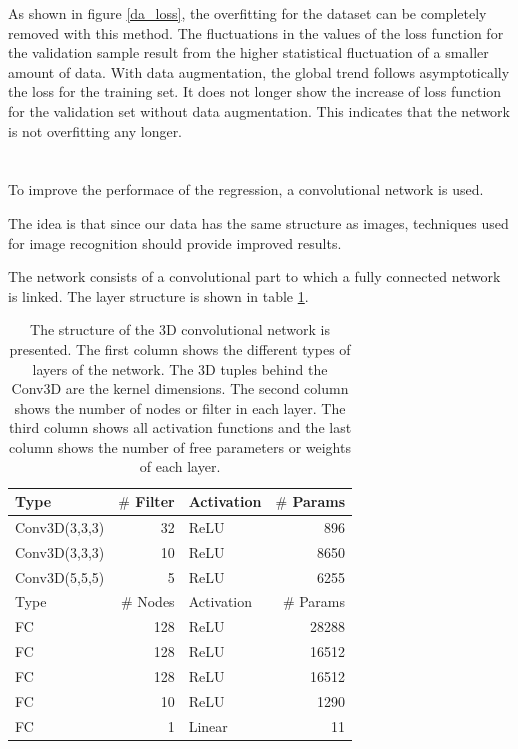 \documentclass[12pt, a4paper]{thesis}
\begin{document}
As shown in figure \ref{da_loss}, the overfitting for the dataset can
be completely removed with this method.  The fluctuations in the
values of the loss function for the validation sample result from the
higher statistical fluctuation of a smaller amount of data. With data
augmentation, the global trend follows asymptotically the loss for the
training set. It does not longer show the increase of loss function
for the validation set without data augmentation. This indicates that
the network is not overfitting any longer.

\clearpage
\section{}

To improve the performace of the regression, a convolutional network
is used.

The idea is that since our data has the same structure as images,
techniques used for image recognition should provide improved results.

The network consists of a convolutional part to which a fully
connected network is linked. The layer structure is shown in table
\ref{conv_structure}.

\begin{table}[htbp]
  \centering
  \begin{tabular}{lrlr}
    Type & \(\#\) Filter & Activation & \(\#\) Params\\
    \hline
    Conv3D(3,3,3) & 32 & ReLU & 896\\
    Conv3D(3,3,3) & 10 & ReLU & 8650\\
    Conv3D(5,5,5) & 5 & ReLU & 6255\\
    \hline
    Type & \(\#\) Nodes & Activation & \(\#\) Params\\
    \hline
    FC & 128 & ReLU & 28288\\
    FC & 128 & ReLU & 16512\\
    FC & 128 & ReLU & 16512\\
    FC & 10 & ReLU & 1290\\
    FC & 1 & Linear & 11\\
  \end{tabular}
  \caption{The structure of the 3D convolutional network is
    presented. The first column shows the different types of layers of
    the network. The 3D tuples behind the Conv3D are the kernel
    dimensions. The second column shows the number of nodes or filter
    in each layer. The third column shows all activation functions and
    the last column shows the number of free parameters or weights of
    each layer.}
  \label{conv_structure}
\end{table}
\end{document}
